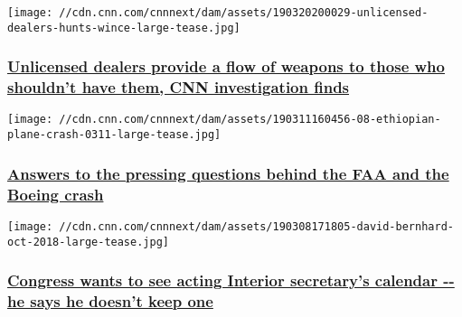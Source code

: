 \href{/2019/03/25/us/unlicensed-gun-dealers-law-invs/index.html}{}

\texttt{[image: //cdn.cnn.com/cnnnext/dam/assets/190320200029-unlicensed-dealers-hunts-wince-large-tease.jpg]}

\hypertarget{unlicensed-dealers-provide-a-flow-of-weapons-to-those-who-shouldnt-have-them-cnn-investigation-finds}{%
\subsubsection{\texorpdfstring{\href{/2019/03/25/us/unlicensed-gun-dealers-law-invs/index.html}{Unlicensed
dealers provide a flow of weapons to those who shouldn't have them, CNN
investigation
finds}}{Unlicensed dealers provide a flow of weapons to those who shouldn't have them, CNN investigation finds}}\label{unlicensed-dealers-provide-a-flow-of-weapons-to-those-who-shouldnt-have-them-cnn-investigation-finds}}

\href{/2019/03/14/politics/faa-boeing-explainer/index.html}{}

\texttt{[image: //cdn.cnn.com/cnnnext/dam/assets/190311160456-08-ethiopian-plane-crash-0311-large-tease.jpg]}

\hypertarget{answers-to-the-pressing-questions-behind-the-faa-and-the-boeing-crash}{%
\subsubsection{\texorpdfstring{\href{/2019/03/14/politics/faa-boeing-explainer/index.html}{Answers
to the pressing questions behind the FAA and the Boeing
crash}}{Answers to the pressing questions behind the FAA and the Boeing crash}}\label{answers-to-the-pressing-questions-behind-the-faa-and-the-boeing-crash}}

\href{/2019/03/08/politics/david-bernhardt-calendar-democrats/index.html}{}

\texttt{[image: //cdn.cnn.com/cnnnext/dam/assets/190308171805-david-bernhard-oct-2018-large-tease.jpg]}

\hypertarget{congress-wants-to-see-acting-interior-secretarys-calendar----he-says-he-doesnt-keep-one}{%
\subsubsection{\texorpdfstring{\href{/2019/03/08/politics/david-bernhardt-calendar-democrats/index.html}{Congress
wants to see acting Interior secretary's calendar -\/- he says he
doesn't keep
one}}{Congress wants to see acting Interior secretary's calendar -\/- he says he doesn't keep one}}\label{congress-wants-to-see-acting-interior-secretarys-calendar----he-says-he-doesnt-keep-one}}

